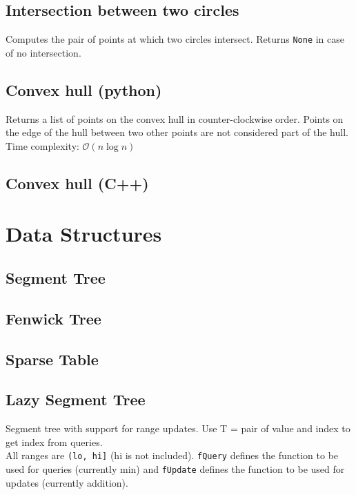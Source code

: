 \documentclass{article}
\begin{document}
\subsection*{Intersection between two circles}
Computes the pair of points at which two circles intersect. Returns \lstinline{None} in case of no intersection.


\subsection*{Convex hull (python)}
Returns a list of points on the convex hull in counter-clockwise order.
Points on the edge of the hull between two other points are not considered part of the hull.
Time complexity: $\mathcal{O}(n \log n)$


\subsection*{Convex hull (C++)}


\pagebreak

\section*{Data Structures}

\subsection*{Segment Tree}


\subsection*{Fenwick Tree}


\subsection*{Sparse Table}


\pagebreak

\subsection*{Lazy Segment Tree}
Segment tree with support for range updates. Use T = pair of value and index to get index from queries.\\
All ranges are \lstinline{(lo, hi]} (hi is not included).
\lstinline{fQuery} defines the function to be used for queries (currently min) and 
\lstinline{fUpdate} defines the function to be used for updates (currently addition).

\end{document}
